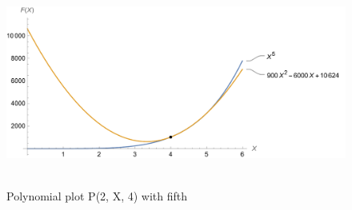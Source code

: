 ﻿\begin{figure}[H]
    \centering
    \includegraphics[width=1\textwidth]{sections/images/03_plots_polynomial_p2_n4_with_fifth}
    ~\caption{Polynomial plot P(2, X, 4) with fifth}\label{fig:figure9}
\end{figure}
